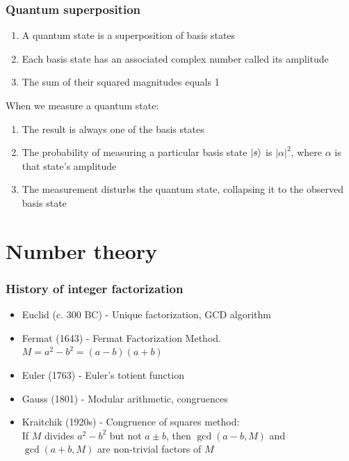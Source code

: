 \documentclass{beamer}
\begin{document}
\begin{frame}
\frametitle{Quantum superposition}
\begin{enumerate}
    \item A quantum state is a superposition of basis states
    \item Each basis state has an associated complex number called its amplitude
    \item The sum of their squared magnitudes equals 1
\end{enumerate}

When we measure a quantum state:
\begin{enumerate}
    \item The result is always one of the basis states
    \item The probability of measuring a particular basis state $\left| s \right\rangle$ is $|\alpha|^2$, where $\alpha$ is that state's amplitude
    \item The measurement disturbs the quantum state, collapsing it to the observed basis state
\end{enumerate}

\end{frame}

\section{Number theory}

\begin{frame}
\frametitle{History of integer factorization}

\begin{itemize}
\item Euclid (c. 300 BC) - Unique factorization, GCD algorithm
\item Fermat (1643) - Fermat Factorization Method. 
$M = a^2 - b^2 = (a - b) (a + b)$
\item Euler (1763) - Euler's totient function
\item Gauss (1801) - Modular arithmetic, congruences
\item Kraitchik (1920s) - Congruence of squares method: \\
      If $M$ divides $a^2 - b^2$ but not $a\pm b$,
      then $\gcd(a-b, M)$ and $\gcd(a+b, M)$ are 
      non-trivial factors of $M$
    \end{itemize}
\end{frame}
\end{document}
